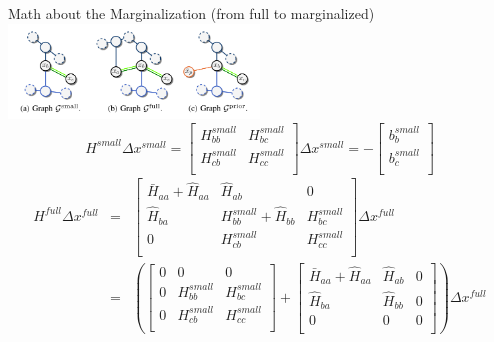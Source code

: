 \documentclass[10pt]{beamer}
\begin{document}
	\begin{frame}{Math about the Marginalization (from full to marginalized)}
		\centering
		\includegraphics[width=0.5\textwidth]{./img/schur.png}
		\begin{equation}
		H^{small} \Delta x^{small} =\left[\begin{array}{cc}
		H_{bb}^{small} & H_{bc}^{small} \\
		H_{cb}^{small} & H_{cc}^{small} \\
		\end{array}\right] \Delta x^{small} = - \left[\begin{array}{c}
		b_{b}^{small} \\
		b_{c}^{small} \\
		\end{array}\right]
		\end{equation}
		\begin{equation}
		\begin{array}{rcl}
		H^{full} \Delta x^{full} & = & \left[\begin{array}{ccc}
		\bar{H}_{aa} + \hat{H}_{aa} & \hat{H}_{ab} & 0 \\
		\hat{H}_{ba} & H_{bb}^{small} + \hat{H}_{bb} & H_{bc}^{small} \\
		0 & H_{cb}^{small} & H_{cc}^{small} \\
		\end{array}\right] \Delta x^{full} \\
		
		& = & \left(\left[\begin{array}{ccc}
		0 & 0 & 0 \\
		0 & H_{bb}^{small} & H_{bc}^{small} \\
		0 & H_{cb}^{small} & H_{cc}^{small} \\
		\end{array}\right]+\left[\begin{array}{ccc}
		\bar{H}_{aa} + \hat{H}_{aa} & \hat{H}_{ab} & 0 \\
		\hat{H}_{ba} & \hat{H}_{bb} & 0 \\
		0 & 0 & 0 \\
		\end{array}\right]\right) \Delta x^{full} \\
		

\end{array}
\end{equation}
\end{frame}
\end{document}

